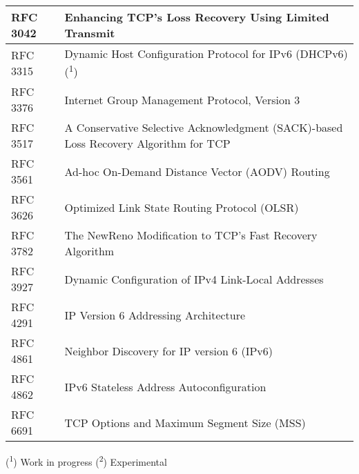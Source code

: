\begin{longtable}{ | l | p{15cm} | }
RFC 3042 &
Enhancing TCP's Loss Recovery Using Limited Transmit \\ \hline

RFC 3315 &
Dynamic Host Configuration Protocol for IPv6 (DHCPv6) (\textsuperscript{1}) \\ \hline

RFC 3376 &
Internet Group Management Protocol, Version 3 \\ \hline

RFC 3517 &
A Conservative Selective Acknowledgment (SACK)-based Loss Recovery Algorithm for TCP \\ \hline

RFC 3561 &
Ad-hoc On-Demand Distance Vector (AODV) Routing \\ \hline

RFC 3626 &
Optimized Link State Routing Protocol (OLSR) \\ \hline

RFC 3782 &
The NewReno Modification to TCP's Fast Recovery Algorithm \\ \hline

RFC 3927 &
Dynamic Configuration of IPv4 Link-Local Addresses \\ \hline

RFC 4291 &
IP Version 6 Addressing Architecture \\ \hline

RFC 4861 &
Neighbor Discovery for IP version 6 (IPv6) \\ \hline

RFC 4862 &
IPv6 Stateless Address Autoconfiguration \\ \hline

RFC 6691 &
TCP Options and Maximum Segment Size (MSS) \\ \hline

\end{longtable}

(\textsuperscript{1}) Work in progress
(\textsuperscript{2}) Experimental
